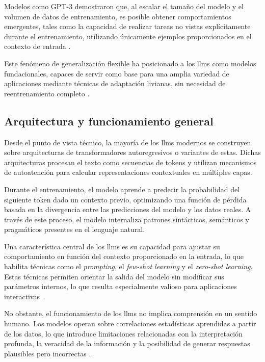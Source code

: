 Modelos como GPT-3 demostraron que, al escalar el tamaño del modelo y el volumen de datos de entrenamiento, es posible obtener comportamientos emergentes, tales como la capacidad de realizar tareas no vistas explícitamente durante el entrenamiento, utilizando únicamente ejemplos proporcionados en el contexto de entrada \parencite{zhao2023survey}.

Este fenómeno de generalización flexible ha posicionado a los \glspl{llm} como modelos fundacionales, capaces de servir como base para una amplia variedad de aplicaciones mediante técnicas de adaptación livianas, sin necesidad de reentrenamiento completo \parencite{zhao2023survey}.

\subsection{Arquitectura y funcionamiento general}

Desde el punto de vista técnico, la mayoría de los \glspl{llm} modernos se construyen sobre arquitecturas de transformadores autoregresivos o variantes de estas. Dichas arquitecturas procesan el texto como secuencias de tokens y utilizan mecanismos de autoatención para calcular representaciones contextuales en múltiples capas.

Durante el entrenamiento, el modelo aprende a predecir la probabilidad del siguiente token dado un contexto previo, optimizando una función de pérdida basada en la divergencia entre las predicciones del modelo y los datos reales. A través de este proceso, el modelo internaliza patrones sintácticos, semánticos y pragmáticos presentes en el lenguaje natural.

Una característica central de los \glspl{llm} es su capacidad para ajustar su comportamiento en función del contexto proporcionado en la entrada, lo que habilita técnicas como el \textit{prompting}, el \textit{few-shot learning} y el \textit{zero-shot learning}. Estas técnicas permiten orientar la salida del modelo sin modificar sus parámetros internos, lo que resulta especialmente valioso para aplicaciones interactivas \parencite{zhao2023survey}.

No obstante, el funcionamiento de los \glspl{llm} no implica comprensión en un sentido humano. Los modelos operan sobre correlaciones estadísticas aprendidas a partir de los datos, lo que introduce limitaciones relacionadas con la interpretación profunda, la veracidad de la información y la posibilidad de generar respuestas plausibles pero incorrectas \parencite{huang2024hallucination}.

